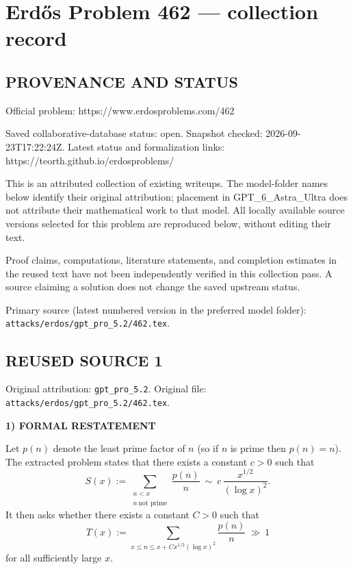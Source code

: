 \section*{Erd\H{o}s Problem 462 --- collection record}

\subsection*{PROVENANCE AND STATUS}
Official problem: https://www.erdosproblems.com/462

Saved collaborative-database status: open.
Snapshot checked: 2026-09-23T17:22:24Z.
Latest status and formalization links: https://teorth.github.io/erdosproblems/

This is an attributed collection of existing writeups. The model-folder names below identify their original attribution; placement in GPT\_6\_Astra\_Ultra does not attribute their mathematical work to that model. All locally available source versions selected for this problem are reproduced below, without editing their text.

Proof claims, computations, literature statements, and completion estimates in the reused text have not been independently verified in this collection pass. A source claiming a solution does not change the saved upstream status.

Primary source (latest numbered version in the preferred model folder): \texttt{attacks/erdos/gpt\_pro\_5.2/462.tex}.

\subsection*{REUSED SOURCE 1}
Original attribution: \texttt{gpt\_pro\_5.2}.
Original file: \texttt{attacks/erdos/gpt\_pro\_5.2/462.tex}.


\noindent\textbf{1) FORMAL RESTATEMENT}

Let $p(n)$ denote the least prime factor of $n$ (so if $n$ is prime then $p(n)=n$).
The extracted problem states that there exists a constant $c>0$ such that
\[S(x):=\sum_{\substack{n<x\\ n\ \textrm{not prime}}}\frac{p(n)}{n}\ \sim\ c\,\frac{x^{1/2}}{(\log x)^2}.
\]
It then asks whether there exists a constant $C>0$ such that
\[T(x):=\sum_{x\le n\le x+C x^{1/2}(\log x)^2}\frac{p(n)}{n}\ \gg\ 1\]
for all sufficiently large $x$.


